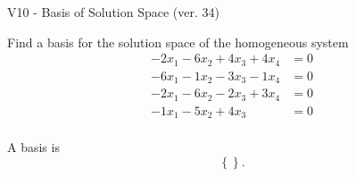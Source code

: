 \begin{exercise}
  \begin{exerciseTitle}V10 - Basis of Solution Space (ver. 34)\end{exerciseTitle}
  \begin{exerciseStatement}
    Find a basis for the solution space of the homogeneous system 
\begin{align*}
 -2 x_ 1 -6 x_ 2 + 4 x_ 3 + 4 x_ 4 &= 0  \\ 
  -6 x_ 1 -1 x_ 2 -3 x_ 3 -1 x_ 4 &= 0  \\ 
  -2 x_ 1 -6 x_ 2 -2 x_ 3 + 3 x_ 4 &= 0  \\ 
  -1 x_ 1 -5 x_ 2 + 4 x_ 3 &= 0  \\ 
 \end{align*}


 
  \end{exerciseStatement}

  \begin{exerciseAnswer}
   A basis is   
\[\left\{\right\}.\]

  


  \end{exerciseAnswer}
\end{exercise}